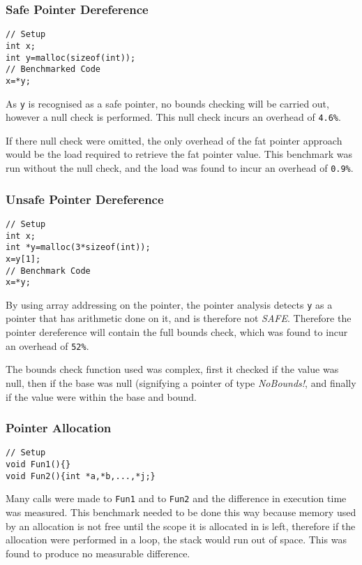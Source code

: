 \subsubsection{Safe Pointer Dereference}

\begin{verbatim}
// Setup
int x;
int y=malloc(sizeof(int));
// Benchmarked Code
x=*y;
\end{verbatim}

As \verb!y! is recognised as a safe pointer, no bounds checking will be carried out, however a null check is performed.
This null check incurs an overhead of \verb!4.6%!.

If there null check were omitted, the only overhead of the fat pointer approach would be the load required to retrieve the fat pointer value.
This benchmark was run without the null check, and the load was found to incur an overhead of \verb!0.9%!.

\subsubsection{Unsafe Pointer Dereference}

\begin{verbatim}
// Setup
int x;
int *y=malloc(3*sizeof(int));
x=y[1];
// Benchmark Code
x=*y;
\end{verbatim}

By using array addressing on the pointer, the pointer analysis detects \verb!y! as a pointer that has arithmetic done on it, and is therefore not \textit{SAFE}.
Therefore the pointer dereference will contain the full bounds check, which was found to incur an overhead of \verb!52%!.

The bounds check function used was complex, first it checked if the value was null, then if the base was null (signifying a pointer of type \textit{NoBounds!}, and finally if the value were within the base and bound.

\subsubsection{Pointer Allocation}

\begin{verbatim}
// Setup
void Fun1(){}
void Fun2(){int *a,*b,...,*j;}
\end{verbatim}

Many calls were made to \verb!Fun1! and to \verb!Fun2! and the difference in execution time was measured.
This benchmark needed to be done this way because memory used by an allocation is not free until the scope it is allocated in is left, therefore if the allocation were performed in a loop, the stack would run out of space.
This was found to produce no measurable difference.

